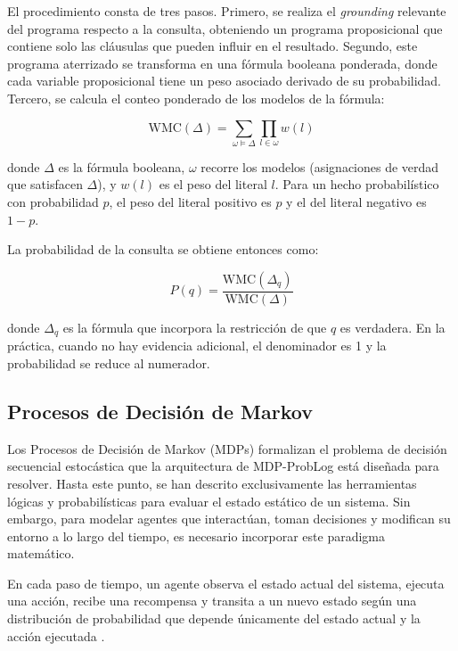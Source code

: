 El procedimiento consta de tres pasos. Primero, se realiza el \textit{grounding} relevante del programa respecto a la consulta, obteniendo un programa proposicional que contiene solo las cláusulas que pueden influir en el resultado. Segundo, este programa aterrizado se transforma en una fórmula booleana ponderada, donde cada variable proposicional tiene un peso asociado derivado de su probabilidad. Tercero, se calcula el conteo ponderado de los modelos de la fórmula:

\begin{equation}
    \text{WMC}(\Delta) = \sum_{\omega \models \Delta} \prod_{l \in \omega} w(l)
    \label{eq:wmc}
\end{equation}

donde $\Delta$ es la fórmula booleana, $\omega$ recorre los modelos (asignaciones de verdad que satisfacen $\Delta$), y $w(l)$ es el peso del literal $l$. Para un hecho probabilístico con probabilidad $p$, el peso del literal positivo es $p$ y el del literal negativo es $1 - p$.

La probabilidad de la consulta se obtiene entonces como:

\begin{equation}
    P(q) = \frac{\text{WMC}(\Delta_q)}{\text{WMC}(\Delta)}
    \label{eq:prob-wmc}
\end{equation}

donde $\Delta_q$ es la fórmula que incorpora la restricción de que $q$ es verdadera. En la práctica, cuando no hay evidencia adicional, el denominador es 1 y la probabilidad se reduce al numerador.

\clearpage
\subsection{Procesos de Decisión de Markov}
\label{sec:mt-mdps}

Los Procesos de Decisión de Markov (MDPs) formalizan el problema de decisión secuencial estocástica que la arquitectura de MDP-ProbLog está diseñada para resolver. Hasta este punto, se han descrito exclusivamente las herramientas lógicas y probabilísticas para evaluar el estado estático de un sistema. Sin embargo, para modelar agentes que interactúan, toman decisiones y modifican su entorno a lo largo del tiempo, es necesario incorporar este paradigma matemático. 

En cada paso de tiempo, un agente observa el estado actual del sistema, ejecuta una acción, recibe una recompensa y transita a un nuevo estado según una distribución de probabilidad que depende únicamente del estado actual y la acción ejecutada \cite{puterman2014markov}.

